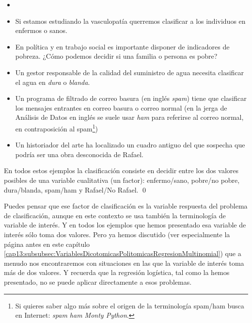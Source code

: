 \begin{ejemplo}
\label{cap13:ejem:EjemplosClasificadores}
\begin{itemize}
\item[]
\item Si estamos estudiando la vasculopatía querremos clasificar a los individuos en enfermos o sanos.

\item En política y en trabajo social es importante disponer de indicadores de pobreza. ¿Cómo podemos decidir si una familia o persona es pobre?

\item Un gestor responsable de la calidad del suministro de agua necesita clasificar el agua en {\em dura} o {\em blanda}.

\item Un programa de filtrado de correo  basura (en inglés {\em spam}) tiene que clasificar los mensajes entrantes en correo basura  o correo normal (en la jerga de Análisis de Datos en inglés se suele usar  {\em  ham} para referirse al correo normal, en contraposición al spam\footnote{Si quieres saber algo más sobre el origen de la terminología spam/ham busca en Internet: {\em spam ham Monty Python}.})

\item Un historiador del arte ha localizado un cuadro antiguo del que sospecha que podría ser una obra desconocida de Rafael.

\end{itemize}
En todos estos ejemplos la clasificación consiste en decidir entre los dos  valores posibles de una variable cualitativa (un factor): enfermo/sano, pobre/no pobre, dura/blanda, spam/ham y Rafael/No Rafael.
\qed
\end{ejemplo}
\noindent Puedes pensar que ese factor de clasificación es la variable respuesta  del problema de clasificación, aunque en este contexto se usa también la terminología de {\sf variable de interés}. Y en todos los ejemplos que hemos presentado esa variable de interés sólo toma dos valores. Pero ya hemos discutido (ver especialmente la página antes en  este capítulo \ref{cap13:subsubsec:VariablesDicotomicasPolitomicasRegresionMultinomial}) que a menudo nos encontraremos con situaciones en las que la variable de interés toma más de dos valores. Y recuerda que la regresión logística, tal como la hemos presentado, no se puede aplicar directamente a esos problemas.
